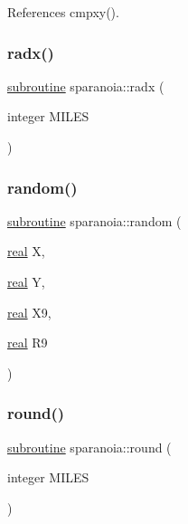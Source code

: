 References cmpxy().

\mbox{\label{sparanoia_8f90_a91e4601692e8df990b28ad4c7f81c096}} 
\subsubsection{\texorpdfstring{radx()}{radx()}}
{\footnotesize\ttfamily \hyperlink{M__stopwatch_83_8txt_acfbcff50169d691ff02d4a123ed70482}{subroutine} sparanoia\+::radx (\begin{DoxyParamCaption}\item[{integer}]{M\+I\+L\+ES }\end{DoxyParamCaption})}

\mbox{\label{sparanoia_8f90_ae429b4770ec5b607af3fbc27e8e02ccc}} 
\subsubsection{\texorpdfstring{random()}{random()}}
{\footnotesize\ttfamily \hyperlink{M__stopwatch_83_8txt_acfbcff50169d691ff02d4a123ed70482}{subroutine} sparanoia\+::random (\begin{DoxyParamCaption}\item[{\hyperlink{read__watch_83_8txt_abdb62bde002f38ef75f810d3a905a823}{real}}]{X,  }\item[{\hyperlink{read__watch_83_8txt_abdb62bde002f38ef75f810d3a905a823}{real}}]{Y,  }\item[{\hyperlink{read__watch_83_8txt_abdb62bde002f38ef75f810d3a905a823}{real}}]{X9,  }\item[{\hyperlink{read__watch_83_8txt_abdb62bde002f38ef75f810d3a905a823}{real}}]{R9 }\end{DoxyParamCaption})}

\mbox{\label{sparanoia_8f90_ada89e3fa6290059b6cb40cf8c8df33b7}} 
\subsubsection{\texorpdfstring{round()}{round()}}
{\footnotesize\ttfamily \hyperlink{M__stopwatch_83_8txt_acfbcff50169d691ff02d4a123ed70482}{subroutine} sparanoia\+::round (\begin{DoxyParamCaption}\item[{integer}]{M\+I\+L\+ES }\end{DoxyParamCaption})}


